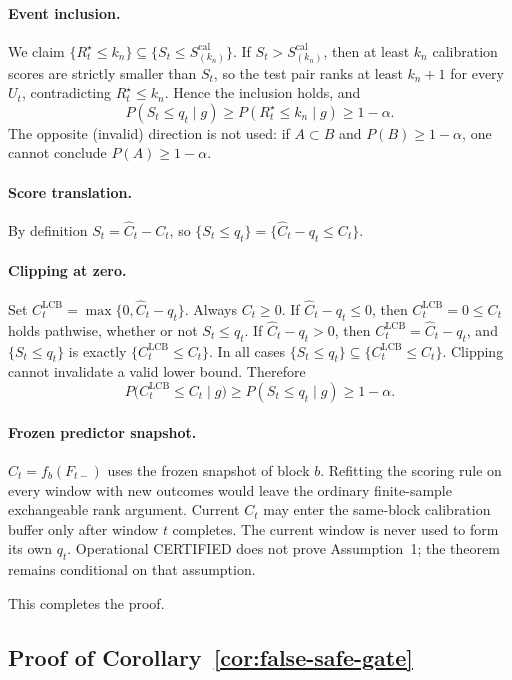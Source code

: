 \paragraph{Event inclusion.}
We claim $\{R_t^\star\le k_n\}\subseteq\{S_t\le S_{(k_n)}^{\mathrm{cal}}\}$.
If $S_t>S_{(k_n)}^{\mathrm{cal}}$, then at least $k_n$ calibration scores are
strictly smaller than $S_t$, so the test pair ranks at least $k_n+1$ for every
$U_t$, contradicting $R_t^\star\le k_n$.  Hence the inclusion holds, and
\[
 P(S_t\le q_t\mid g)
 \ge
 P(R_t^\star\le k_n\mid g)
 \ge 1-\alpha.
\]
The opposite (invalid) direction is not used: if $A\subset B$ and
$P(B)\ge 1-\alpha$, one cannot conclude $P(A)\ge 1-\alpha$.

\paragraph{Score translation.}
By definition $S_t=\widehat C_t-C_t$, so
$\{S_t\le q_t\}=\{\widehat C_t-q_t\le C_t\}$.

\paragraph{Clipping at zero.}
Set $C^{\mathrm{LCB}}_t=\max\{0,\widehat C_t-q_t\}$.  Always $C_t\ge 0$.
If $\widehat C_t-q_t\le 0$, then $C^{\mathrm{LCB}}_t=0\le C_t$ holds pathwise,
whether or not $S_t\le q_t$.  If $\widehat C_t-q_t>0$, then
$C^{\mathrm{LCB}}_t=\widehat C_t-q_t$, and $\{S_t\le q_t\}$ is exactly
$\{C^{\mathrm{LCB}}_t\le C_t\}$.  In all cases
$\{S_t\le q_t\}\subseteq\{C^{\mathrm{LCB}}_t\le C_t\}$.  Clipping cannot
invalidate a valid lower bound.  Therefore
\[
 P\bigl(C^{\mathrm{LCB}}_t\le C_t\mid g\bigr)
 \ge
 P(S_t\le q_t\mid g)
 \ge 1-\alpha.
\]

\paragraph{Frozen predictor snapshot.}
$\widehat C_t=f_b(F_{t-})$ uses the frozen snapshot of block $b$.  Refitting
the scoring rule on every window with new outcomes would leave the ordinary
finite-sample exchangeable rank argument.  Current $C_t$ may enter the
same-block calibration buffer only after window $t$ completes.  The current
window is never used to form its own $q_t$.  Operational CERTIFIED does not
prove Assumption~1; the theorem remains
conditional on that assumption.

This completes the proof.

\subsection{Proof of Corollary~\ref{cor:false-safe-gate}}
\label{app:proof_false_safe}

